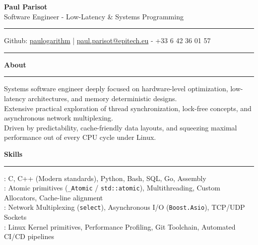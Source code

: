 \documentclass[9pt]{extarticle}
\begin{document}
\begin{center}
    {\huge\bfseries Paul Parisot}
    \\[10pt]
    {\Large Software Engineer - Low-Latency \& Systems Programming}
    \\
\end{center}

\par\vspace{-10pt}
\rule{\linewidth}{0.4pt}
\par\vspace{-10pt}

\begin{center}
    Github: \href{https://github.com/paulogarithm}{paulogarithm} 
    \quad | \quad 
    \href{mailto:paul.parisot@epitech.eu}{paul.parisot@epitech.eu} - +33 6 42 36 01 57
\end{center}

\par\vspace{-15pt}
\rule{\linewidth}{0.4pt}
\par\vspace{5pt}

{\large\bfseries About}
\par\vspace{-8pt}
\rule{\linewidth}{0.4pt}
\par\vspace{5pt}

Systems software engineer deeply focused on hardware-level optimization, low-latency architectures, and memory deterministic designs. \\
Extensive practical exploration of thread synchronization, lock-free concepts, and asynchronous network multiplexing. \\
Driven by predictability, cache-friendly data layouts, and squeezing maximal performance out of every CPU cycle under Linux.

\par\vspace{5pt}

{\large\bfseries Skills}
\par\vspace{-8pt}
\rule{\linewidth}{0.4pt}
\par\vspace{5pt}

\hspace*{5pt}{\bfseries Core Automation}: C, C++ (Modern standards), Python, Bash, SQL, Go, Assembly \\
\hspace*{5pt}{\bfseries Concurrency \& Memory}: Atomic primitives (\texttt{\_Atomic} / \texttt{std::atomic}), Multithreading, Custom Allocators, Cache-line alignment \\
\hspace*{5pt}{\bfseries Networking \& Sockets}: Network Multiplexing (\texttt{select}), Asynchronous I/O (\texttt{Boost.Asio}), TCP/UDP Sockets \\
\hspace*{5pt}{\bfseries Software Engineering}: Linux Kernel primitives, Performance Profiling, Git Toolchain, Automated CI/CD pipelines
\end{document}
